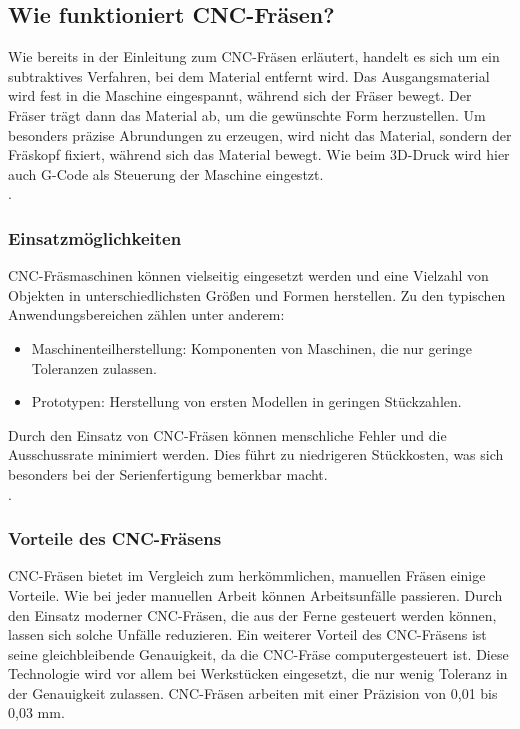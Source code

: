 \subsection{Wie funktioniert CNC-Fräsen?}
Wie bereits in der Einleitung zum CNC-Fräsen erläutert, handelt es sich um ein subtraktives Verfahren, bei dem Material entfernt wird. Das Ausgangsmaterial wird fest in die Maschine eingespannt, während sich der Fräser bewegt. Der Fräser trägt dann das Material ab, um die gewünschte Form herzustellen. Um besonders präzise Abrundungen zu erzeugen, wird nicht das Material, sondern der Fräskopf fixiert, während sich das Material bewegt. Wie beim 3D-Druck wird hier auch G-Code als Steuerung der Maschine eingestzt. \\
\cite{CNC-Fraesen_2} \cite{CNC-Fraesen_3}.


\subsubsection{Einsatzmöglichkeiten}
CNC-Fräsmaschinen können vielseitig eingesetzt werden und eine Vielzahl von Objekten in unterschiedlichsten Größen und Formen herstellen. Zu den typischen Anwendungsbereichen zählen unter anderem:

\begin{itemize}
	\item Maschinenteilherstellung: Komponenten von Maschinen, die nur geringe Toleranzen zulassen.
	\item Prototypen: Herstellung von ersten Modellen in geringen Stückzahlen.
\end{itemize}

Durch den Einsatz von CNC-Fräsen können menschliche Fehler und die Ausschussrate minimiert werden. Dies führt zu niedrigeren Stückkosten, was sich besonders bei der Serienfertigung bemerkbar macht.\\
 \cite{CNC-Fraesen_2} \cite{CNC-Fraesen_3}.

\subsubsection{Vorteile des CNC-Fräsens}
CNC-Fräsen bietet im Vergleich zum herkömmlichen, manuellen Fräsen einige Vorteile. Wie bei jeder manuellen Arbeit können Arbeitsunfälle passieren. Durch den Einsatz moderner CNC-Fräsen, die aus der Ferne gesteuert werden können, lassen sich solche Unfälle reduzieren. Ein weiterer Vorteil des CNC-Fräsens ist seine gleichbleibende Genauigkeit, da die CNC-Fräse computergesteuert ist. Diese Technologie wird vor allem bei Werkstücken eingesetzt, die nur wenig Toleranz in der Genauigkeit zulassen. CNC-Fräsen arbeiten mit einer Präzision von 0,01 bis 0,03 mm. \\
\cite{CNC-Fraesen_Vorteile}

